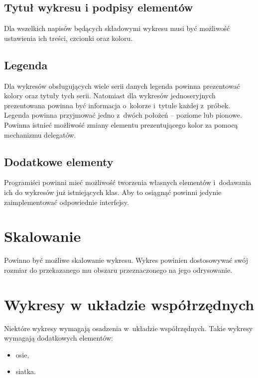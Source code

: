 \subsection{Tytuł wykresu i podpisy elementów}
Dla wszelkich napisów będących składowymi wykresu musi być możliwość ustawienia ich treści, czcionki oraz koloru.

\subsection{Legenda}
Dla wykresów obsługujących wiele serii danych legenda powinna prezentować kolory oraz tytuły tych serii. Natomiast dla wykresów jednoseryjnych prezentowana powinna być informacja o~kolorze i~tytule każdej z~próbek. Legenda powinna przyjmować jedno z~dwóch położeń -- poziome lub pionowe. Powinna istnieć możliwość zmiany elementu prezentującego kolor za pomocą mechanizmu delegatów.

\subsection{Dodatkowe elementy}
Programiści powinni mieć możliwość tworzenia własnych elementów i~dodawania ich do wykresów już istniejących klas. Aby to osiągnąć powinni jedynie zaimplementować odpowiednie interfejsy.


\section{Skalowanie}
Powinno być możliwe skalowanie wykresu. Wykres powinien dostosowywać swój rozmiar do przekazanego mu obszaru przeznaczonego na jego odrysowanie.



\section{Wykresy w układzie współrzędnych}
Niektóre wykresy wymagają osadzenia w~układzie współrzędnych. Takie wykresy wymagają dodatkowych elementów:

\begin{itemize}
\item{osie,}
\item{siatka.}
\end{itemize}

